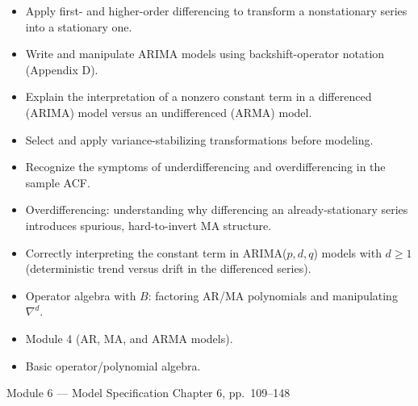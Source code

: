 \documentclass[11pt]{article}
\begin{document}
\begin{objectives}
\begin{itemize}
  \item Apply first- and higher-order differencing to transform a nonstationary series into a stationary one.
  \item Write and manipulate ARIMA models using backshift-operator notation (Appendix D).
  \item Explain the interpretation of a nonzero constant term in a differenced (ARIMA) model versus an undifferenced (ARMA) model.
  \item Select and apply variance-stabilizing transformations before modeling.
  \item Recognize the symptoms of underdifferencing and overdifferencing in the sample ACF.
\end{itemize}
\end{objectives}

\begin{difficult}
\begin{itemize}
  \item Overdifferencing: understanding why differencing an already-stationary series introduces spurious, hard-to-invert MA structure.
  \item Correctly interpreting the constant term in ARIMA($p,d,q$) models with $d \geq 1$ (deterministic trend versus drift in the differenced series).
  \item Operator algebra with $B$: factoring AR/MA polynomials and manipulating $\nabla^d$.
\end{itemize}
\end{difficult}

\begin{prereqs}
\begin{itemize}
  \item Module 4 (AR, MA, and ARMA models).
  \item Basic operator/polynomial algebra.
\end{itemize}
\end{prereqs}

\vspace{6pt}
\begin{moduletitle}{Module 6 --- Model Specification}
\small Chapter 6, pp.\ 109--148
\end{moduletitle}
\end{document}
